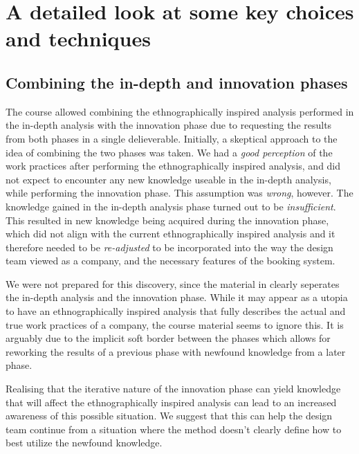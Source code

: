 \section{A detailed look at some key choices and techniques} \label{sec:detailed}
\subsection{Combining the in-depth and innovation phases}


The course allowed combining the ethnographically inspired analysis performed in the
in-depth analysis with the innovation phase due to requesting the results from 
both phases in a single delieverable. Initially, a skeptical approach to the
idea of combining the two phases was taken. We had a \textit{good perception} of the 
work practices after performing the ethnographically inspired analysis, and did not expect
to encounter any new knowledge useable in the in-depth analysis, while performing the 
innovation phase. This assumption was \textit{wrong}, however.
The knowledge gained in the in-depth analysis phase turned out
to be \textit{insufficient}. This resulted in new knowledge being
acquired during the innovation phase, which did not align with the current 
ethnographically inspired analysis and it therefore needed to be \textit{re-adjusted} to be incorporated 
into the way the design team viewed 
\gomonkey{} as a company, and the necessary features of the booking system.

We were not prepared for this discovery, since the material in 
\cite{bodker2004participatory} clearly seperates the in-depth analysis and the 
innovation phase. While it may appear as a utopia to have an ethnographically inspired analysis
that fully describes the actual and true work practices of a company, the course 
material seems to ignore this. It is arguably due to the implicit soft border
between the phases which allows for reworking the results of a previous phase with
newfound knowledge from a later phase.

Realising that the iterative nature of the innovation phase can yield knowledge that
will affect the ethnographically inspired analysis can lead to an increased 
awareness of this possible situation. We suggest that this can help the design team 
continue from a situation where the method doesn't clearly define how to best
utilize the newfound knowledge.

